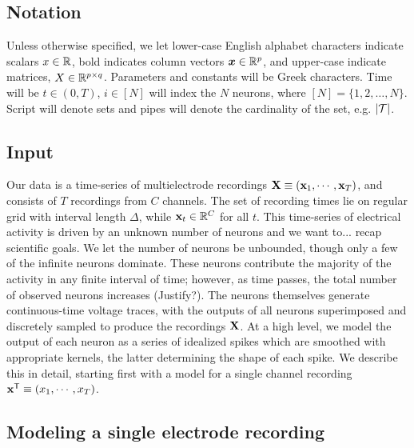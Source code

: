 \newcommand{\by}{\mathbf{y}}
\newcommand{\bA}{\mathbf{A}}

\subsection{Notation}

Unless otherwise specified, we let lower-case English alphabet characters indicate scalars $x \in \mathbb{R}$, bold indicates column vectors $\boldsymbol{x} \in \mathbb{R}^p$, and upper-case indicate matrices, $X \in \mathbb{R}^{p \times q}$.  Parameters and constants will be Greek characters.  Time will be $t \in (0,T)$, $i \in [N]$ will index the $N$ neurons, where $[N]=\{1,2,\ldots,N\}$. Script will denote sets and pipes will denote the cardinality of the set, e.g. $|\mathcal{T}|$.  

\subsection{Input}
Our data is a time-series of multielectrode recordings $\mathbf{X} \equiv (\mathbf{x}_1, \cdots, \mathbf{x}_T)$, and consists of $T$ recordings from $C$ channels. 
The set of recording times lie on regular grid with interval length $\Delta$, while $\mathbf{x}_t \in \mathbb{R}^C$ for all $t$. 
This time-series of electrical activity is driven by an unknown number of neurons {\color{red} and we want to... recap scientific goals}. 
We let the number of neurons be unbounded, though only a few of the infinite
neurons dominate. These neurons contribute the majority of the activity in any finite interval of time; however, as time passes, the total number of 
observed neurons increases {\color{red}(Justify?)}. 
The neurons themselves generate continuous-time voltage traces, with the outputs of all neurons superimposed and discretely sampled to produce the 
recordings $\mathbf{X}$.  At a high level, we model the output of each neuron as a
series of idealized spikes which are smoothed with appropriate kernels, the latter determining the shape of each spike. 
We describe this in detail, starting first with a model for a single channel recording $\mathbf{x}^{\mathsf{T}} \equiv (x_1, \cdots, x_T)$.

\subsection{Modeling a single electrode recording}

